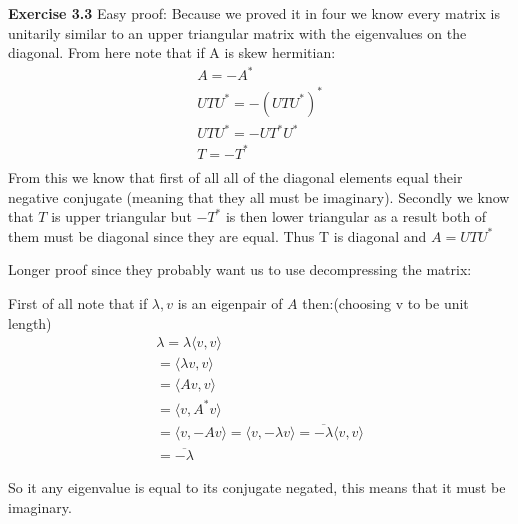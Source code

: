 \documentclass[12pt]{article}
\newenvironment{exercise}[1]{\vspace{.1in}\noindent\textbf{Exercise #1 \hspace{.05em}}}{}
\theoremstyle{definition}
\theoremstyle{remark}
\begin{document}
\begin{exercise}{3.3}
	Easy proof: Because we proved it in four we know every matrix is unitarily similar to an upper triangular matrix with the eigenvalues on the diagonal. From here note that if A is skew hermitian:
	\begin{align}
		A=-A^*           \\
		UTU^*=-(UTU^*)^* \\
		UTU^*=-UT^{*}U^* \\
		T=-T^{*}         \\
	\end{align}
	From this we know that first of all all of the diagonal elements equal their negative conjugate (meaning that they all must be imaginary). Secondly we know that $T$ is upper triangular but $-T^*$ is then lower triangular as a result both of them must be diagonal since they are equal. Thus T is diagonal and $A=UTU^*$

	Longer proof since they probably want us to use decompressing the matrix:

	First of all note that if $\lambda,v$ is an eigenpair of $A$ then:(choosing v to be unit length)
	\begin{align}
		\lambda = \lambda\langle v,v\rangle                                                        \\
		=\langle \lambda v,v\rangle                                                                \\
		=\langle Av,v\rangle                                                                       \\
		=\langle v,A^*v\rangle                                                                     \\
		=\langle v,-Av\rangle = \langle v,-\lambda v\rangle= \overline{-\lambda}\langle v,v\rangle \\
		=\overline{-\lambda}
	\end{align}

	So it any eigenvalue is equal to its conjugate negated, this means that it must be imaginary.


\end{exercise}
\end{document}
